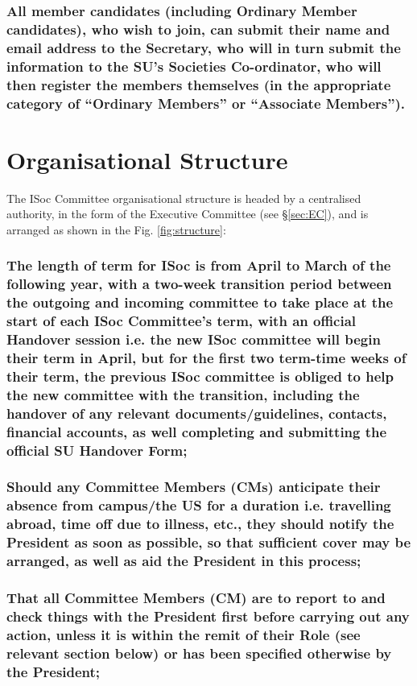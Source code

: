 \documentclass[12pt]{article}
\newcommand\invisiblesubsection[1]{%
  \refstepcounter{subsection}%
  \addcontentsline{toc}{subsection}{\protect\numberline{\thesubsection}#1}%
  \subsectionmark{#1}}
\newcommand{\nocontentsline}[3]{}
\newcommand{\tocless}[2]{\bgroup\let\addcontentsline=\nocontentsline#1{#2}\egroup}
\begin{document}
\subsubsection{All member candidates (including Ordinary Member candidates), who wish to join, can submit their name and email address to the Secretary, who will in turn submit the information to the SU's Societies Co-ordinator, who will then register the members themselves (in the appropriate category of ``Ordinary Members'' or ``Associate Members'').}

\section{Organisational Structure}
\label{sec:structure}
The ISoc Committee organisational structure is headed by a centralised authority, in the form of the Executive Committee (see \S\ref{sec:EC}), and is arranged as shown in the Fig. \ref{fig:structure}:

\tocless\invisiblesubsection{}
\setcounter{subsection}{0}

\subsubsection{The length of term for ISoc is from April to March of the following year, with a two-week transition period between the outgoing and incoming committee to take place at the start of each ISoc Committee's term, with an official Handover session i.e. the new ISoc committee will begin their term in April, but for the first two term-time weeks of their term, the previous ISoc committee is obliged to help the new committee with the transition, including the handover of any relevant documents/guidelines, contacts, financial accounts, as well completing and submitting the official SU Handover Form;}
\label{subsubsec:handover}
\subsubsection{Should any Committee Members (CMs) anticipate their absence from campus/the US for a duration i.e. travelling abroad, time off due to illness, etc., they should notify the President as soon as possible, so that sufficient cover may be arranged, as well as aid the President in this process;}
\subsubsection{That all Committee Members (CM) are to report to and check things with the President first before carrying out any action, unless it is within the remit of their Role (see relevant section below) or has been specified otherwise by the President;}
\end{document}
